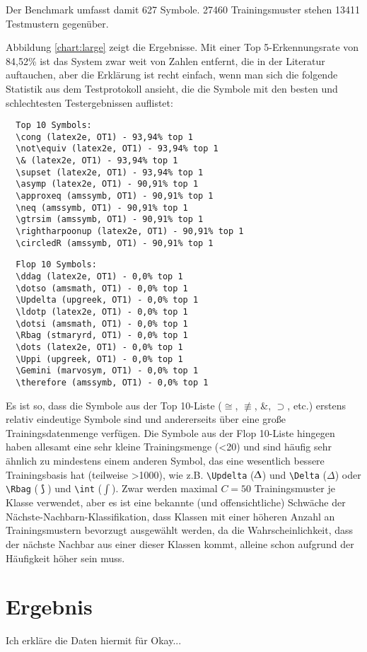 Der Benchmark umfasst damit 627 Symbole. 27460 Trainingsmuster stehen 13411 Testmustern gegenüber.

Abbildung \ref{chart:large} zeigt die Ergebnisse. Mit einer Top 5-Erkennungsrate von 84,52\% ist das System zwar weit von Zahlen entfernt, die in der Literatur auftauchen, aber die Erklärung ist recht einfach, wenn man sich die folgende Statistik aus dem Testprotokoll ansieht, die die Symbole mit den besten und schlechtesten Testergebnissen auflistet:

\begin{verbatim}
  Top 10 Symbols:
  \cong (latex2e, OT1) - 93,94% top 1
  \not\equiv (latex2e, OT1) - 93,94% top 1
  \& (latex2e, OT1) - 93,94% top 1
  \supset (latex2e, OT1) - 93,94% top 1
  \asymp (latex2e, OT1) - 90,91% top 1
  \approxeq (amssymb, OT1) - 90,91% top 1
  \neq (amssymb, OT1) - 90,91% top 1
  \gtrsim (amssymb, OT1) - 90,91% top 1
  \rightharpoonup (latex2e, OT1) - 90,91% top 1
  \circledR (amssymb, OT1) - 90,91% top 1
\end{verbatim}
  
\begin{verbatim}
  Flop 10 Symbols:
  \ddag (latex2e, OT1) - 0,0% top 1
  \dotso (amsmath, OT1) - 0,0% top 1
  \Updelta (upgreek, OT1) - 0,0% top 1
  \ldotp (latex2e, OT1) - 0,0% top 1
  \dotsi (amsmath, OT1) - 0,0% top 1
  \Rbag (stmaryrd, OT1) - 0,0% top 1
  \dots (latex2e, OT1) - 0,0% top 1
  \Uppi (upgreek, OT1) - 0,0% top 1
  \Gemini (marvosym, OT1) - 0,0% top 1
  \therefore (amssymb, OT1) - 0,0% top 1
\end{verbatim}

Es ist so, dass die Symbole aus der Top 10-Liste ($\cong$, $\not\equiv$, \&, $\supset$, etc.) erstens relativ eindeutige Symbole sind und andererseits über eine große Trainingsdatenmenge verfügen. Die Symbole aus der Flop 10-Liste hingegen haben allesamt eine sehr kleine Trainingsmenge (<20) und sind häufig sehr ähnlich zu mindestens einem anderen Symbol, das eine wesentlich bessere Trainingsbasis hat (teilweise >1000), wie z.B. \verb!\Updelta! ($\Updelta$) und \verb!\Delta! ($\Delta$) oder \verb!\Rbag! ($\Rbag$) und \verb!\int! ($\int$). Zwar werden maximal $C=50$ Trainingsmuster je Klasse verwendet, aber es ist eine bekannte (und offensichtliche) Schwäche der Nächste-Nachbarn-Klassifikation, dass Klassen mit einer höheren Anzahl an Trainingsmustern bevorzugt ausgewählt werden, da die Wahrscheinlichkeit, dass der nächste Nachbar aus einer dieser Klassen kommt, alleine schon aufgrund der Häufigkeit höher sein muss.

\section{Ergebnis}

\TODO Ich erkläre die Daten hiermit für Okay...